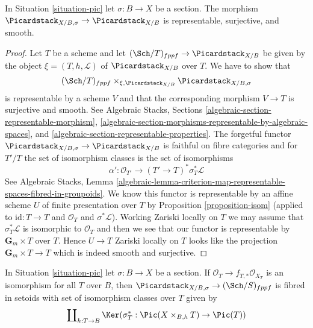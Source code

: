 \begin{lemma}
\label{lemma-compare-pic-with-section}
In Situation \ref{situation-pic} let $\sigma : B \to X$ be a section.
The morphism $\Picardstack_{X/B, \sigma} \to \Picardstack_{X/B}$
is representable, surjective, and smooth.
\end{lemma}

\begin{proof}
Let $T$ be a scheme and let $(\Sch/T)_{fppf} \to \Picardstack_{X/B}$
be given by the object $\xi = (T, h, \mathcal{L})$ of $\Picardstack_{X/B}$
over $T$. We have to show that
$$
(\Sch/T)_{fppf} \times_{\xi, \Picardstack_{X/B}} \Picardstack_{X/B, \sigma}
$$
is representable by a scheme $V$ and that the corresponding morphism
$V \to T$ is surjective and smooth. See
Algebraic Stacks, Sections \ref{algebraic-section-representable-morphism},
\ref{algebraic-section-morphisms-representable-by-algebraic-spaces}, and
\ref{algebraic-section-representable-properties}.
The forgetful functor $\Picardstack_{X/B, \sigma} \to \Picardstack_{X/B}$
is faithful on fibre categories and for $T'/T$ the set of isomorphism
classes is the set of isomorphisms
$$
\alpha' : \mathcal{O}_{T'} \longrightarrow (T' \to T)^*\sigma_T^*\mathcal{L}
$$
See Algebraic Stacks, Lemma
\ref{algebraic-lemma-criterion-map-representable-spaces-fibred-in-groupoids}.
We know this functor is representable by an affine scheme $U$ of finite
presentation over $T$ by Proposition \ref{proposition-isom}
(applied to $\text{id} : T \to T$ and $\mathcal{O}_T$ and
$\sigma^*\mathcal{L}$). Working Zariski locally on $T$ we may
assume that $\sigma_T^*\mathcal{L}$ is isomorphic to $\mathcal{O}_T$
and then we see that our functor is representable by
$\mathbf{G}_m \times T$ over $T$. Hence
$U \to T$ Zariski locally on $T$ looks like 
the projection $\mathbf{G}_m \times T \to T$ which
is indeed smooth and surjective.
\end{proof}

\begin{lemma}
\label{lemma-flat-geometrically-connected-fibres-with-section-functor-stack}
In Situation \ref{situation-pic} let $\sigma : B \to X$ be a section.
If $\mathcal{O}_T \to f_{T, *}\mathcal{O}_{X_T}$ is an isomorphism
for all $T$ over $B$, then
$\Picardstack_{X/B, \sigma} \to (\Sch/S)_{fppf}$
is fibred in setoids with set of isomorphism classes over $T$ given by
$$
\coprod\nolimits_{h : T \to B}
\Ker(\sigma_T^* : \Pic(X \times_{B, h} T) \to \Pic(T))
$$
\end{lemma}

